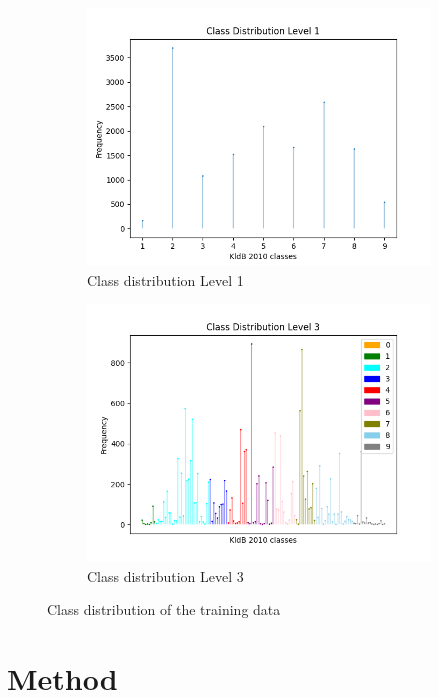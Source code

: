 \documentclass[12pt, a4paper, titlepage]{article}
\begin{document}
\begin{figure}
  \begin{subfigure}{.5\textwidth}
    \centering
    \includegraphics[width=.9\linewidth]{training_data_short_L1.png}
    \caption{\label{fig: F9} Class distribution Level 1}
  \end{subfigure}%
  \begin{subfigure}{.5\textwidth}
    \centering
    \includegraphics[width=.9\linewidth]{training_data_short_L3.png}
    \caption{\label{fig: F10} Class distribution Level 3}
  \end{subfigure}
  \caption{Class distribution of the training data}
  \end{figure}


\section{Method}
\end{document}
